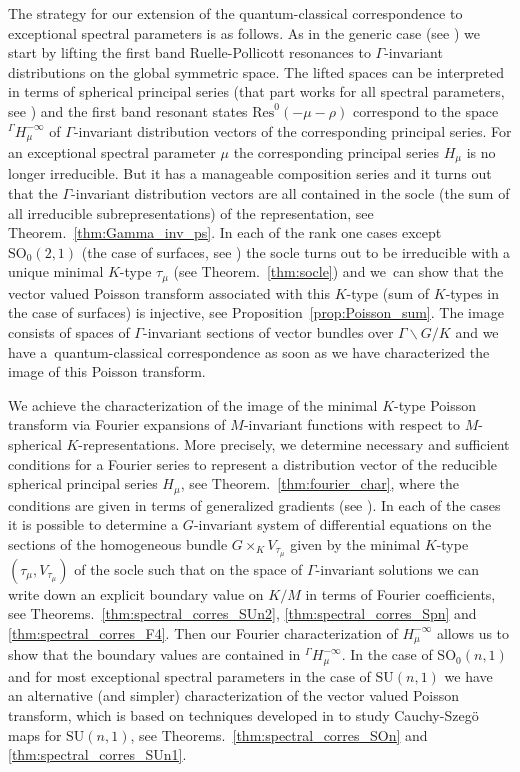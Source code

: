 \documentclass[JEP,XML,SOM,NoFloatCountersInSection,Unicode,published]{cedram}
\newcommand{\Ga}{{}^\Gamma\!}
\theoremstyle{definition}
\begin{document}
The strategy for our extension of the quantum-classical correspondence to exceptional spectral parameters is as follows. As in the generic case (see \cite[\S 3.2]{GHWb}) we start by lifting the first band Ruelle-Pollicott resonances to $\Gamma$-invariant distributions on the global symmetric space. The lifted spaces can be interpreted in terms of spherical principal series (that part works for all spectral parameters, see \cite[Prop.\,3.8]{GHWb}) and the first band resonant states $\mathrm{Res}^0(-\mu-\rho)$ correspond to the space $\Ga H_\mu^{-\infty}$ of $\Gamma$-invariant distribution vectors of the corresponding principal series. For an exceptional spectral parameter $\mu$ the corresponding principal series $H_\mu$ is no longer irreducible. But it has a manageable composition series and it turns out that the $\Gamma$-invariant distribution vectors are all contained in the socle (\ie the sum of all irre\-ducible subrepresentations) of the representation, see Theorem.~\ref{thm:Gamma_inv_ps}. In each of the rank one cases except $\mathrm{SO}_0(2,1)$ (the case of surfaces, see \cite{GHWa}) the socle turns out to be irreducible with a unique minimal $K$-type $\tau_\mu$ (see Theorem.~\ref{thm:socle}) and we~can show that the vector valued Poisson transform associated with this $K$-type (sum of $K$-types in the case of surfaces) is injective, see Proposition~\ref{prop:Poisson_sum}. The image consists of spaces of $\Gamma$-invariant sections of vector bundles over $\Gamma\backslash G/K$ and we have a~quantum-classical correspondence as soon as we have characterized the image of this Poisson transform.\enlargethispage{.5\baselineskip}

We achieve the characterization of the image of the minimal $K$-type Poisson transform via Fourier expansions of $M$-invariant functions with respect to $M$-spherical $K$-representations. More precisely, we determine necessary and sufficient conditions for a Fourier series to represent a distribution vector of the reducible spherical principal series $H_\mu$, see Theorem.~\ref{thm:fourier_char}, where the conditions are given in terms of generalized gradients (see \cite{BransonOlafsson}). In each of the cases it is possible to determine a $G$-invariant system of differential equations on the sections of the homogeneous bundle $G\times_K V_{\tau_\mu}$ given by the minimal $K$-type $(\tau_\mu,V_{\tau_\mu})$ of the socle such that on the space of $\Gamma$-invariant solutions we can write down an explicit boundary value on $K/M$ in terms of Fourier coefficients, see Theorems.~\ref{thm:spectral_corres_SUn2}, \ref{thm:spectral_corres_Spn} and \ref{thm:spectral_corres_F4}. Then our Fourier characterization of $H_\mu^{-\infty}$ allows us to show that the boundary values are contained in $\Ga H_\mu^{-\infty}$. In the case of $\mathrm{SO}_0(n,1)$ and for most exceptional spectral parameters in the case of $\mathrm{SU}(n,1)$ we have an alternative (and simpler) characterization of the vector valued Poisson transform, which is based on techniques developed in \cite{M89} to study Cauchy-Szegö maps for $\mathrm{SU}(n,1)$, see Theorems.~\ref{thm:spectral_corres_SOn} and \ref{thm:spectral_corres_SUn1}.
\end{document}
